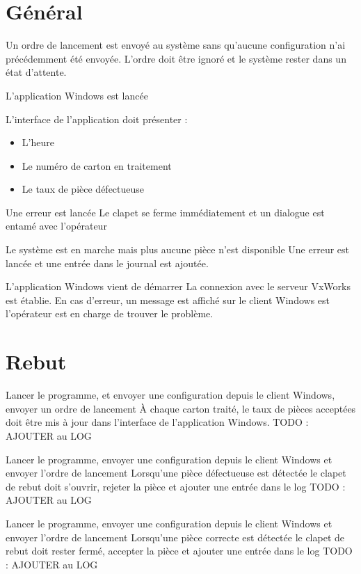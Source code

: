 \section{Général}

{Un ordre de lancement est envoyé au système sans qu'aucune configuration n'ai précédemment été envoyée.}
{L'ordre doit être ignoré et le système rester dans un état d'attente.}

{L'application Windows est lancée}
{L'interface de l'application doit présenter :
\begin{itemize}
	\item L'heure
	\item Le numéro de carton en traitement
	\item Le taux de pièce défectueuse
\end{itemize}
}

{Une erreur est lancée}
{Le clapet se ferme immédiatement et un dialogue est entamé avec l'opérateur}

{Le système est en marche mais plus aucune pièce n'est disponible}
{Une erreur est lancée et une entrée dans le journal est ajoutée.}

{L'application Windows vient de démarrer}
{La connexion avec le serveur VxWorks est établie. En cas d'erreur, un message est affiché sur le client Windows est l'opérateur est en charge de trouver le problème.}

\section{Rebut}
{Lancer le programme, et envoyer une configuration depuis le client Windows, envoyer un ordre de lancement}
{À chaque carton traité, le taux de pièces acceptées doit être mis à jour dans l'interface de l'application Windows.}
TODO : AJOUTER au LOG

{Lancer le programme, envoyer une configuration depuis le client Windows et envoyer l'ordre de lancement}
{Lorsqu'une pièce défectueuse est détectée le clapet de rebut doit s'ouvrir, rejeter la pièce et ajouter une entrée dans le log}
TODO : AJOUTER au LOG

{Lancer le programme, envoyer une configuration depuis le client Windows et envoyer l'ordre de lancement}
{Lorsqu'une pièce correcte est détectée le clapet de rebut doit rester fermé, accepter la pièce et ajouter une entrée dans le log}
TODO : AJOUTER au LOG

